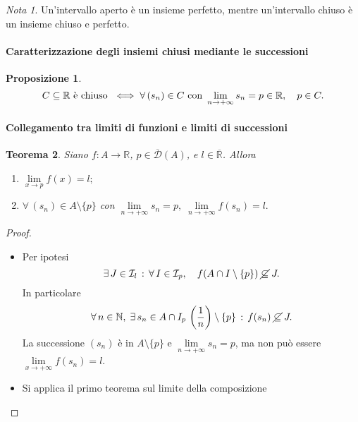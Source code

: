 \documentclass{article}
\theoremstyle{plain}
\newtheorem{thm}{Teorema}[section]
\newtheorem{prop}[thm]{Proposizione}
\theoremstyle{definition}
\theoremstyle{remark}
\newtheorem{note}{Nota}
\begin{document}
\vspace{10pt}

\begin{note}
    Un'intervallo aperto è un insieme perfetto, mentre un'intervallo chiuso è un insieme chiuso e perfetto.
\end{note}

\vspace{10pt}

\paragraph{Caratterizzazione degli insiemi chiusi mediante le successioni}
\begin{bxthm}
\begin{prop}
    \[C\subseteq \mathbb{R} \textup{ è chiuso }\iff\forall\,(s_n)\in C\textup{ con } \lim_{n\to+\infty}s_n=p\in\mathbb{R},\quad p\in C.\]
\end{prop}
\end{bxthm}

\vspace{10pt}

\paragraph{Collegamento tra limiti di funzioni e limiti di successioni}
\begin{bxthm}
\begin{thm}
    Siano $f:A\to \mathbb{R}$, $p\in\overline{\mathcal{D}}(A)$, e $l\in \overline{\mathbb{R}}$. Allora
    \begin{enumerate}
        \item[$(a)$] $\lim\limits_{x\to p}f(x)=l;$ 
        \item[$(b)$] $\forall\, (s_n)\in A\setminus\{p\}$ con $\lim\limits_{n\to +\infty}s_n=p,\;\lim\limits_{n\to+\infty}f(s_n)=l.$
    \end{enumerate}
\end{thm}
\end{bxthm}
\begin{proof}\hfill
    \begin{itemize}
        \item[$\lnot(a)\implies\lnot(b)$]
        Per ipotesi \[\exists\,J\in \mathcal{I}_l\,:\,\forall\,I\in\mathcal{I}_p,\quad f(A\cap I\setminus\{p\})\;\cancel{\subseteq}\; J.\]
        In particolare \[\forall\,n\in\mathbb{N},\;\exists\,s_n\in A\cap I_p\,\left(\dfrac{1}{n}\right)\setminus\{p\}\,:\,f(s_n)\;\cancel{\subseteq}\;J.\]
        La successione $(s_n)$ è in $A\setminus\{p\}$ e $\lim\limits_{n\to+\infty}s_n=p$, ma non può essere $\lim\limits_{x\to+\infty}f(s_n)=l$.
        \item[$(a)\implies(b)$]
        Si applica il primo teorema sul limite della composizione
    \end{itemize}
\end{proof}
\end{document}
